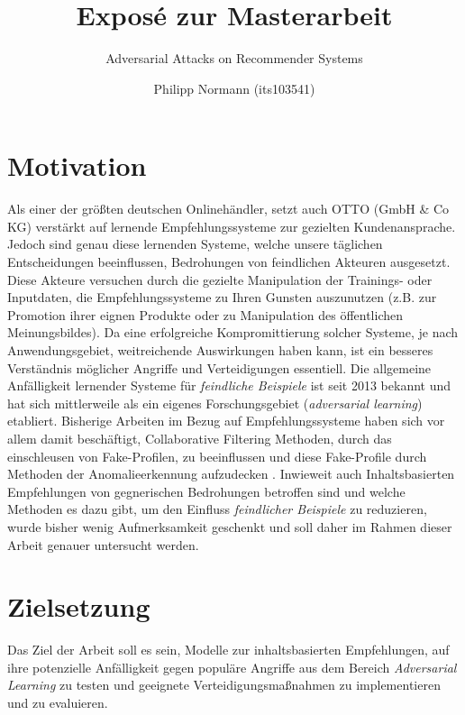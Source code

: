 \documentclass{scrartcl}
\title{Exposé zur Masterarbeit}
\subtitle{Adversarial Attacks on Recommender Systems}
\author{Philipp Normann (its103541)}
\begin{document}
	\maketitle
	
	\section{Motivation}
	Als einer der größten deutschen Onlinehändler, setzt auch OTTO (GmbH \& Co KG) verstärkt auf lernende Empfehlungssysteme zur gezielten Kundenansprache. Jedoch sind genau diese lernenden Systeme, welche unsere täglichen Entscheidungen beeinflussen, Bedrohungen von feindlichen Akteuren ausgesetzt.
	Diese Akteure versuchen durch die gezielte Manipulation der Trainings- oder Inputdaten, die Empfehlungssysteme zu Ihren Gunsten auszunutzen (z.B. zur Promotion ihrer eignen Produkte oder zu Manipulation des öffentlichen Meinungsbildes).
	Da eine erfolgreiche Kompromittierung solcher Systeme, je nach Anwendungsgebiet, weitreichende Auswirkungen haben kann, ist ein besseres Verständnis möglicher Angriffe und Verteidigungen essentiell. 
	Die allgemeine Anfälligkeit lernender Systeme für \textit{feindliche Beispiele} ist seit 2013 bekannt \cite{biggio2013evasion,szegedy2014intriguing, goodfellow2014explaining} und hat sich mittlerweile als ein eigenes Forschungsgebiet (\textit{adversarial learning}) etabliert. 
	Bisherige Arbeiten im Bezug auf Empfehlungssysteme haben sich vor allem damit beschäftigt, Collaborative Filtering Methoden, durch das einschleusen von Fake-Profilen, zu beeinflussen  \cite{o2002promoting, christakopoulou2019adversarial} und diese Fake-Profile durch Methoden der Anomalieerkennung aufzudecken \cite{chirita2005preventing, williams2006profile}.
	Inwieweit auch Inhaltsbasierten Empfehlungen von gegnerischen Bedrohungen betroffen sind und welche Methoden es dazu gibt, um den Einfluss \textit{feindlicher Beispiele} zu reduzieren, wurde bisher wenig Aufmerksamkeit geschenkt und soll daher im Rahmen dieser Arbeit genauer untersucht werden.

	\section{Zielsetzung}
	Das Ziel der Arbeit soll es sein, Modelle zur inhaltsbasierten Empfehlungen, auf ihre potenzielle Anfälligkeit gegen populäre Angriffe aus dem Bereich \textit{Adversarial Learning} zu testen und geeignete Verteidigungsmaßnahmen zu implementieren und zu evaluieren.
	
\end{document}
